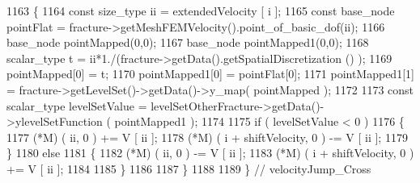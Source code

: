 \begin{DoxyCode}
1163     \{
1164         \textcolor{keyword}{const} size\_type ii = extendedVelocity [ i ];
1165         \textcolor{keyword}{const} base\_node pointFlat = fracture->getMeshFEMVelocity().point\_of\_basic\_dof(ii);
1166         base\_node pointMapped(0,0);
1167         base\_node pointMapped1(0,0);
1168     scalar\_type t = ii*1./(fracture->getData().getSpatialDiscretization () );
1169         pointMapped[0] = t;
1170         pointMapped1[0] = pointFlat[0];
1171         pointMapped1[1] = fracture->getLevelSet()->getData()->y\_map( pointMapped );
1172 
1173     \textcolor{keyword}{const} scalar\_type levelSetValue = levelSetOtherFracture->getData()->ylevelSetFunction ( pointMapped1 );
1174 
1175         \textcolor{keywordflow}{if} ( levelSetValue < 0 )
1176         \{
1177             (*M) ( ii, 0 ) += V [ ii ];
1178             (*M) ( i + shiftVelocity, 0 ) -= V [ ii ];
1179         \}
1180         \textcolor{keywordflow}{else}
1181         \{
1182             (*M) ( ii, 0 ) -= V [ ii ];
1183             (*M) ( i + shiftVelocity, 0 ) += V [ ii ];
1184 
1185         \}
1186 
1187     \}
1188 
1189 \} \textcolor{comment}{// velocityJump\_Cross}
\end{DoxyCode}
